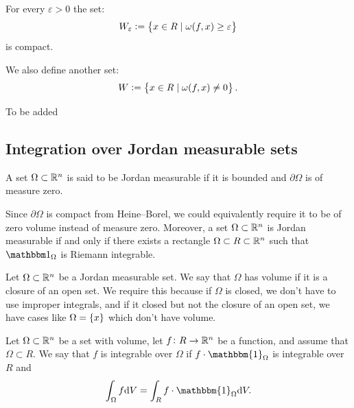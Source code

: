 \documentclass[11pt,a4paper]{article}
\begin{document}
\begin{lemma}
  For every $\varepsilon > 0$ the set:
  \[
    W_\varepsilon := 
    \left\{x \in R \mid \omega(f,x) \geq \varepsilon\right\}
  \]
  is compact.
\end{lemma}

\begin{remark}
  We also define another set:
  \[
    W := \left\{x \in R \mid \omega(f,x) \neq 0\right\}.
  \]
\end{remark}

\begin{proofof}{}
  To be added
\end{proofof}

\subsection{Integration over Jordan measurable sets}

\begin{definition}
  A set $\Omega \subset \mathbb{R}^n$ is said to be Jordan measurable
  if it is bounded and $\partial \Omega$ is of measure zero.
\end{definition}

\begin{remark}
  Since $\partial \Omega$ is compact from Heine--Borel,
  we could equivalently require it to be of zero volume instead of
  measure zero.
  Moreover, a set $\Omega \subset \mathbb{R}^n$ is Jordan measurable if and only
  if there exists a rectangle $\Omega \subset R \subset \mathbb{R}^n$
  such that $\ind_{\Omega}$ is Riemann integrable.
\end{remark}

\begin{definition}
  Let $\Omega \subset \mathbb{R}^n$ be a Jordan measurable set.
  We say that $\Omega$ has volume if it is a closure of an open set.
  We require this because if $\Omega$ is closed,
  we don't have to use improper integrals,
  and if it closed but not the closure of an open set,
  we have cases like $\Omega = \left\{x\right\}$ which don't have volume.
\end{definition}

\begin{definition}
  \label{def:integrability-of-f-for-kids}
  Let $\Omega \subset \mathbb{R}^n$ be a set with volume,
  let $f \colon R \to \mathbb{R}^n$ be a function,
  and assume that $\Omega \subset R$.
  We say that $f$ is integrable over $\Omega$ if
  $f \cdot \mathbbm{1}_{\Omega}$ is integrable over $R$ and
  \[
    \int_{\Omega} f \dV = \int_{R} f \cdot \mathbbm{1}_{\Omega} \dV.
  \]
\end{definition}
\end{document}
